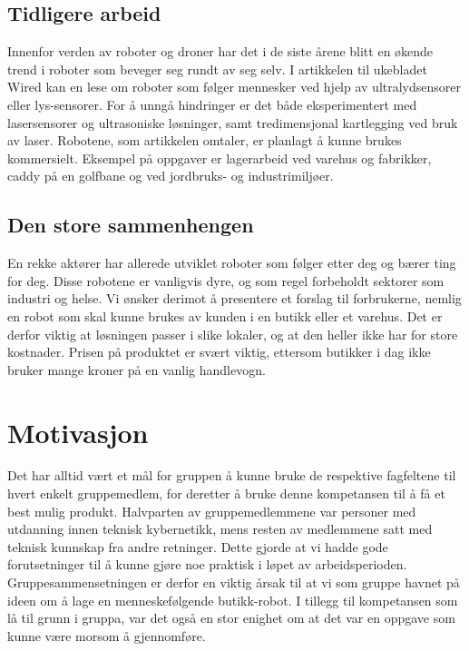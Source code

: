 \subsection{Tidligere arbeid}
Innenfor verden av roboter og droner har det i de siste årene blitt en økende trend i roboter som beveger seg rundt av seg selv. I artikkelen til ukebladet Wired \citep{next_big_trend} kan en lese om roboter som følger mennesker ved hjelp av ultralydsensorer eller lys-sensorer. For å unngå hindringer er det både eksperimentert med lasersensorer og ultrasoniske løsninger, samt tredimensjonal kartlegging ved bruk av laser. Robotene, som artikkelen omtaler, er planlagt å kunne brukes kommersielt. Eksempel på oppgaver er lagerarbeid ved varehus og fabrikker, caddy på en golfbane og ved jordbruks- og industrimiljøer.

\subsection{Den store sammenhengen}
En rekke aktører har allerede utviklet roboter som følger etter deg og bærer ting for deg. Disse robotene er vanligvis dyre, og som regel forbeholdt sektorer som industri og helse. Vi ønsker derimot å presentere et forslag til forbrukerne, nemlig en robot som skal kunne brukes av kunden i en butikk eller et varehus. Det er derfor viktig at løsningen passer i slike lokaler, og at den heller ikke har for store kostnader. Prisen på produktet er svært viktig, ettersom butikker i dag ikke bruker mange kroner på en vanlig handlevogn. %

\section{Motivasjon}
Det har alltid vært et mål for gruppen å kunne bruke de respektive fagfeltene til hvert enkelt gruppemedlem, for deretter å bruke denne kompetansen til å få et best mulig produkt. Halvparten av gruppemedlemmene var personer med utdanning innen teknisk kybernetikk, mens resten av medlemmene satt med teknisk kunnskap fra andre retninger. Dette gjorde at vi hadde gode forutsetninger til å kunne gjøre noe praktisk i løpet av arbeidsperioden. Gruppesammensetningen er derfor en viktig årsak til at vi som gruppe havnet på ideen om å lage en menneskefølgende butikk-robot. I tillegg til kompetansen som lå til grunn i gruppa, var det også en stor enighet om at det var en oppgave som kunne være morsom å gjennomføre.

